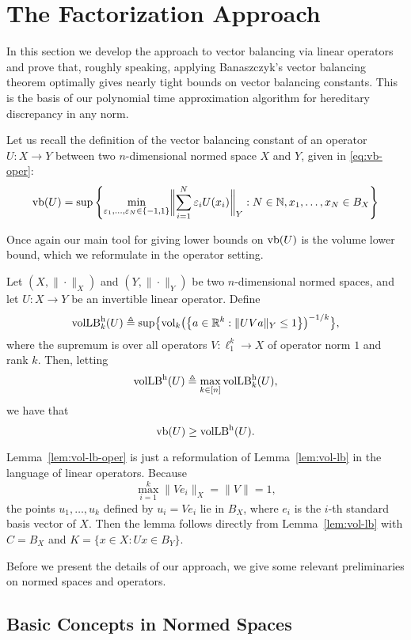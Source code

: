 \section{The Factorization Approach}
\label{sec:factorization}

In this section we develop the approach to vector balancing via linear
operators and prove that, roughly speaking, applying Banaszczyk's
vector balancing theorem optimally gives nearly tight bounds on vector
balancing constants. This  is the basis of our polynomial time
approximation algorithm for hereditary discrepancy in any norm.

Let us recall the definition of the vector balancing constant of an
operator $U:X \to Y$ between two $n$-dimensional normed space $X$ and
$Y$, given in \eqref{eq:vb-oper}:
\[
\operatorname{vb}(U) = \sup\left\{
  \min_{\varepsilon_1, \ldots, \varepsilon_N \in \{-1, 1\}} 
  \biggl\|\sum_{i = 1}^N \varepsilon_i U(x_i)\biggr\|_Y:
  N \in \mathbb{N}, x_1, \ldots, x_N \in B_X\right\}
\]

Once again our main tool for giving lower bounds on
$\operatorname{vb}(U)$ is the volume lower bound, which we reformulate in the
operator setting.

\begin{lemma}
\label{lem:vol-lb-oper}
Let $(X, \|\cdot\|_X)$ and $(Y, \|\cdot\|_Y)$ be two $n$-dimensional
normed spaces, and let $U:X \to Y$ be an invertible linear
operator. Define
\[
\operatorname{volLB}_k^{\rm h}(U) \triangleq
\sup\bigl\{\operatorname{vol}_k\bigl(\left\{ a \in {\mathbb{R}}^k: \|UV a\|_Y \le 1 \right\}\bigr)^{-1/k}\bigr\},
\]
where the supremum is over all operators $V:\ell_1^k \to X$ of
operator norm $1$ and rank $k$. Then, letting
\[
\operatorname{volLB}^{\rm h}(U) \triangleq \max_{k \in [n]} \operatorname{volLB}_k^{\rm h}(U),
\]
we have that
\[
\operatorname{vb}(U) \geq \operatorname{volLB}^{\rm h}(U).
\]
\end{lemma}

Lemma~\ref{lem:vol-lb-oper} is just a reformulation of
Lemma~\ref{lem:vol-lb} in the language of linear operators. Because
\[
\max_{i = 1}^k{\|Ve_i\|_X} = \|V\| = 1,
\]
the points $u_1, \ldots, u_k$ defined by $u_i = V e_i$ lie in $B_X$,
where $e_i$ is the $i$-th standard basis vector of $X$. Then the
lemma follows directly from Lemma~\ref{lem:vol-lb} with $C = B_X$
and $K = \{x \in X: Ux \in B_Y\}$. 

Before we present the details of our approach, we give some
relevant preliminaries on normed spaces and operators. 


\subsection{Basic Concepts in Normed Spaces}
\label{sect:fact-prelims}

